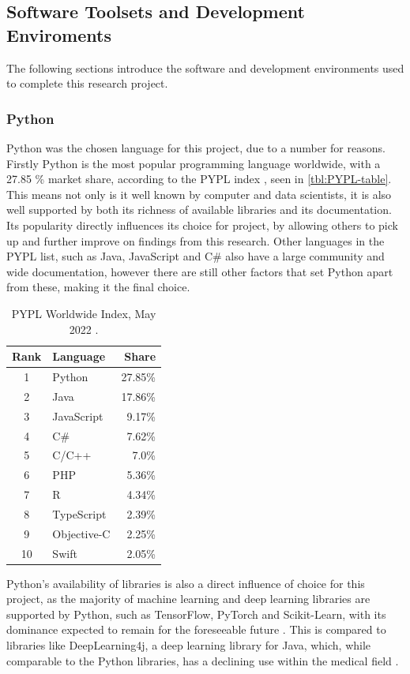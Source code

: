 \subsection{Software Toolsets and Development Enviroments}
The following sections introduce the software and development environments used to complete this research project.

\subsubsection{Python}
Python was the chosen language for this project, due to a number for reasons. Firstly Python is the most popular programming language worldwide, with a 27.85 \% market share, according to the PYPL index \citep{PYPLPopu3:online}, seen in \autoref{tbl:PYPL-table}. This means not only is it well known by computer and data scientists, it is also well supported by both its richness of available libraries and its documentation. Its popularity directly influences its choice for project, by allowing others to pick up and further improve on findings from this research. Other languages in the PYPL list, such as Java, JavaScript and C\# also have a large community and wide documentation, however there are still other factors that set Python apart from these, making it the final choice. 

\begin{table}[H]
    \caption{PYPL Worldwide Index, May 2022 \citep{PYPLPopu3:online}.}
    \centering
    \begin{tabular}{c|l|r}
        Rank & Language & Share \\
        \hline\hline
        1 & Python & 27.85\% \\
        2 & Java & 17.86\% \\
        3 & JavaScript & 9.17\% \\
        4 & C\# & 7.62\% \\
        5 & C/C++ & 7.0\% \\
        6 & PHP & 5.36\% \\
        7 & R & 4.34\% \\
        8 & TypeScript & 2.39\% \\
        9 & Objective-C & 2.25\% \\
        10 & Swift & 2.05\% \\
    \end{tabular}
    \label{tbl:PYPL-table}
\end{table}

Python's availability of libraries is also a direct influence of choice for this project, as the majority of machine learning and deep learning libraries are supported by Python, such as TensorFlow, PyTorch and Scikit-Learn, with its dominance expected to remain for the foreseeable future \citep{raschka2020machine}. This is compared to libraries like DeepLearning4j, a deep learning library for Java, which, while comparable to the Python libraries, has a declining use within the medical field \citep{erickson2017toolkits}. 


